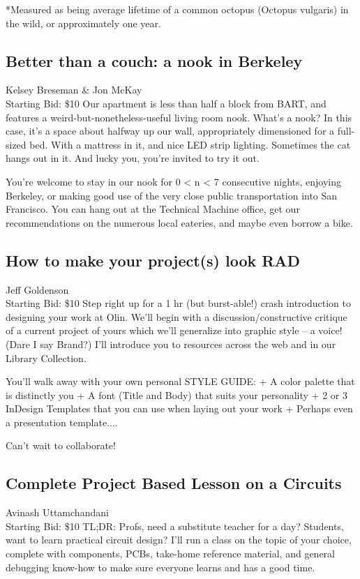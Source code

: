 \documentclass[11pt]{article}
\begin{document}
*Measured as being average lifetime of a common octopus (Octopus vulgaris) in the wild, or approximately one year.
\subsection{Better than a couch: a nook in Berkeley}
Kelsey Breseman \& Jon McKay
\\
Starting Bid: \$10
\newline
Our apartment is less than half a block from BART, and features a weird-but-nonetheless-useful living room nook. What's a nook? In this case, it's a space about halfway up our wall, appropriately dimensioned for a full-sized bed. With a mattress in it, and nice LED strip lighting. Sometimes the cat hangs out in it. And lucky you, you're invited to try it out.

You're welcome to stay in our nook for 0 < n < 7 consecutive nights, enjoying Berkeley, or making good use of the very close public transportation into San Francisco. You can hang out at the Technical Machine office, get our recommendations on the numerous local eateries, and maybe even borrow a bike.
\subsection{How to make your project(s) look RAD}
Jeff Goldenson
\\
Starting Bid: \$10
\newline
Step right up for a 1 hr (but burst-able!) crash introduction to designing your work at Olin.  We'll begin with a discussion/constructive critique of a current project of yours which we'll generalize into graphic style -- a voice!  (Dare I say Brand?) I'll introduce you to resources across the web and in our Library Collection. 

You'll walk away with your own personal STYLE GUIDE:
+ A color palette that is distinctly you
+ A font (Title and Body) that suits your personality
+ 2 or 3 InDesign Templates that you can use when laying out your work
+ Perhaps even a presentation template....

Can't wait to collaborate!
\subsection{Complete Project Based Lesson on a Circuits}
Avinash Uttamchandani
\\
Starting Bid: \$10
\newline
TL;DR: Profs, need a substitute teacher for a day?  Students, want to learn practical circuit design?  I'll run a class on the topic of your choice, complete with components, PCBs, take-home reference material, and general debugging know-how to make sure everyone learns and has a good time.
\end{document}
